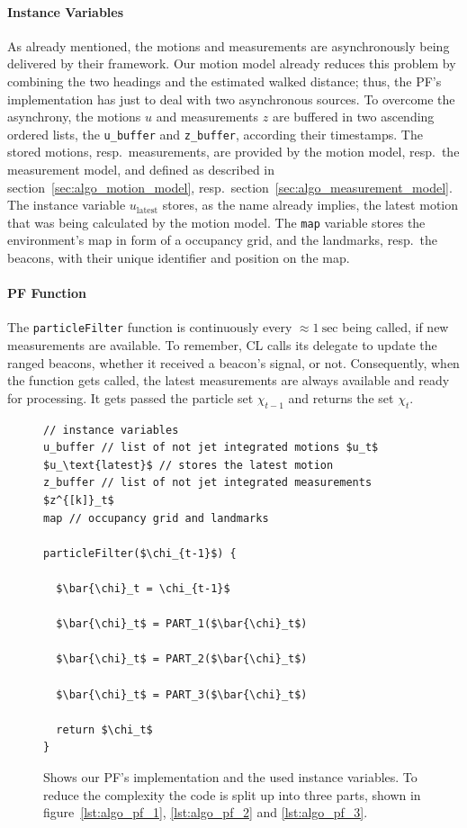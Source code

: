 \paragraph{Instance Variables} As already mentioned, the motions and measurements are asynchronously being delivered by their framework. Our motion model already reduces this problem by combining the two headings and the estimated walked distance; thus, the \acs{PF}'s implementation has just to deal with two asynchronous sources. To overcome the asynchrony, the motions $u$ and measurements $z$ are buffered in two ascending ordered lists, the \texttt{u\_buffer} and \texttt{z\_buffer}, according their timestamps. The stored motions, resp.\ measurements, are provided by the motion model, resp.\ the measurement model, and defined as described in section~\ref{sec:algo_motion_model}, resp.\ section~\ref{sec:algo_measurement_model}. The instance variable $u_\text{latest}$ stores, as the name already implies, the latest motion that was being calculated by the motion model. The \texttt{map} variable stores the environment's map in form of a occupancy grid, and the landmarks, resp.\ the beacons, with their unique identifier and position on the map.

\paragraph{\acs{PF} Function} The \texttt{particleFilter} function is continuously every $\approx 1~\text{sec}$ being called, if new measurements are available. To remember, \ac{CL} calls its delegate to update the ranged beacons, whether it received a beacon's signal, or not. Consequently, when the function gets called, the latest measurements are always available and ready for processing. It gets passed the particle set $\chi_{t-1}$ and returns the set $\chi_t$.

\begin{figure}
\begin{lstlisting}[mathescape]
// instance variables
u_buffer // list of not jet integrated motions $u_t$
$u_\text{latest}$ // stores the latest motion
z_buffer // list of not jet integrated measurements $z^{[k]}_t$
map // occupancy grid and landmarks

particleFilter($\chi_{t-1}$) {

  $\bar{\chi}_t = \chi_{t-1}$

  $\bar{\chi}_t$ = PART_1($\bar{\chi}_t$)
  
  $\bar{\chi}_t$ = PART_2($\bar{\chi}_t$)
  
  $\bar{\chi}_t$ = PART_3($\bar{\chi}_t$)
    
  return $\chi_t$
}
\end{lstlisting}
\caption{Shows our \acs{PF}'s implementation and the used instance variables. To reduce the complexity the code is split up into three parts, shown in figure~\ref{lst:algo_pf_1}, \ref{lst:algo_pf_2} and \ref{lst:algo_pf_3}.}
\label{lst:algo_pf}
\end{figure}


